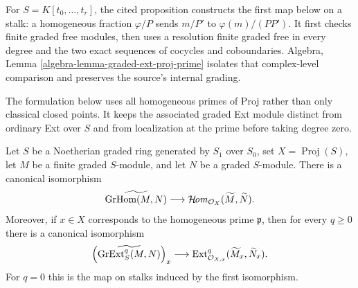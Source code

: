 \begin{lemma}
\label{lemma-proj-internal-hom-ext}
\begin{reference}
\cite[Chapter III, \S 5, no. 73, Proposition 1 and proof,
pp. 267--268]{FAC}
\end{reference}
\begin{history}
For $S=K[t_0,\ldots,t_r]$, the cited proposition constructs the first map
below on a stalk: a homogeneous fraction $\varphi/P$ sends $m/P'$ to
$\varphi(m)/(PP')$. It first checks finite graded free modules, then uses a
resolution finite graded free in every degree and the two exact sequences of
cocycles and coboundaries. Algebra, Lemma
\ref{algebra-lemma-graded-ext-proj-prime} isolates that complex-level
comparison and preserves the source's internal grading.

The formulation below uses all homogeneous primes of Proj rather than only
classical closed points. It keeps the associated graded Ext module distinct
from ordinary Ext over $S$ and from localization at the prime before taking
degree zero.
\end{history}
Let $S$ be a Noetherian graded ring generated by $S_1$ over $S_0$, set
$X=\operatorname{Proj}(S)$, let $M$ be a finite graded $S$-module, and let
$N$ be a graded $S$-module. There is a canonical isomorphism
$$
\widetilde{\text{GrHom}(M,N)}
\longrightarrow
\mathop{\mathcal{H}\!\mathit{om}}\nolimits_{\mathcal O_X}(\widetilde M,\widetilde N).
$$
Moreover, if $x\in X$ corresponds to the homogeneous prime $\mathfrak p$,
then for every $q\geq0$ there is a canonical isomorphism
$$
\left(\widetilde{\text{GrExt}^q_S(M,N)}\right)_x
\longrightarrow
\mathop{\mathrm{Ext}}\nolimits^q_{\mathcal O_{X,x}}(\widetilde M_x,\widetilde N_x).
$$
For $q=0$ this is the map on stalks induced by the first isomorphism.
\end{lemma}

